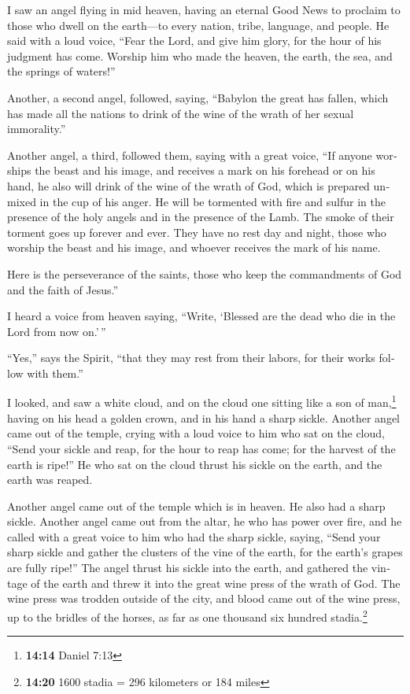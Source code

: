\begin{paracol}{2}
\begin{otherlanguage}{english}
 I saw an angel flying in mid heaven, having an eternal
Good News to proclaim to those who dwell on the earth---to every nation,
tribe, language, and people.  He said with a loud voice,
``Fear the Lord, and give him glory, for the hour of his judgment has
come. Worship him who made the heaven, the earth, the sea, and the
springs of waters!''

 Another, a second angel, followed, saying, ``Babylon the
great has fallen, which has made all the nations to drink of the wine of
the wrath of her sexual immorality.''

 Another angel, a third, followed them, saying with a
great voice, ``If anyone worships the beast and his image, and receives
a mark on his forehead or on his hand,  he also will
drink of the wine of the wrath of God, which is prepared unmixed in the
cup of his anger. He will be tormented with fire and sulfur in the
presence of the holy angels and in the presence of the Lamb.
 The smoke of their torment goes up forever and ever.
They have no rest day and night, those who worship the beast and his
image, and whoever receives the mark of his name.

 Here is the perseverance of the saints, those who keep
the commandments of God and the faith of Jesus.''

 I heard a voice from heaven saying, ``Write, `Blessed
are the dead who die in the Lord from now on.'\,''

``Yes,'' says the Spirit, ``that they may rest from their labors, for
their works follow with them.''

 I looked, and saw a white cloud, and on the cloud one
sitting like a son of man,\footnote{\textbf{14:14} Daniel 7:13} having
on his head a golden crown, and in his hand a sharp sickle.
 Another angel came out of the temple, crying with a loud
voice to him who sat on the cloud, ``Send your sickle and reap, for the
hour to reap has come; for the harvest of the earth is ripe!''
 He who sat on the cloud thrust his sickle on the earth,
and the earth was reaped.

 Another angel came out of the temple which is in heaven.
He also had a sharp sickle.  Another angel came out from
the altar, he who has power over fire, and he called with a great voice
to him who had the sharp sickle, saying, ``Send your sharp sickle and
gather the clusters of the vine of the earth, for the earth's grapes are
fully ripe!''  The angel thrust his sickle into the
earth, and gathered the vintage of the earth and threw it into the great
wine press of the wrath of God.  The wine press was
trodden outside of the city, and blood came out of the wine press, up to
the bridles of the horses, as far as one thousand six hundred
stadia.\footnote{\textbf{14:20} 1600 stadia = 296 kilometers or 184
  miles}


\end{otherlanguage}
\end{paracol}
